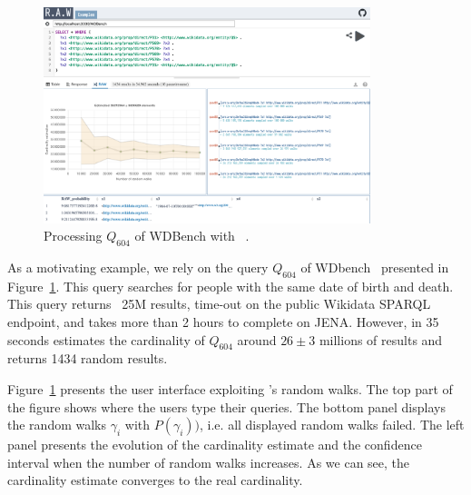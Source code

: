  \begin{figure}
   \centering
   \includegraphics[width=0.85\textwidth]{figures/raw_screenshot.png}
   \caption{\label{fig:raw_screenshot} Processing  $Q_{604}$ of
     WDBench\cite{angles2022wdbench} with ~\NAME.}
 \end{figure}


 As a motivating example, we rely on the query $Q_{604}$ of
 WDbench~\cite{angles2022wdbench} presented in
 Figure~\ref{fig:raw_screenshot}. This query searches for people
 with the same date of birth and death. This query returns ~25M results,
 time-out on the public Wikidata SPARQL endpoint, and takes more than
 2 hours to complete on JENA. However, in 35 seconds \NAME estimates
 the cardinality of $Q_{604}$ around $26 \pm 3$ millions of results and
 returns 1434 random results.

 
 Figure~\ref{fig:raw_screenshot} presents the user interface
 exploiting \NAME's random walks. The top part of the figure shows
 where the users type their queries. The bottom panel displays the
 random walks $\gamma_i$ with $P(\gamma_i))$, i.e. all displayed random
 walks failed.  The left panel presents the evolution of the cardinality
 estimate and the confidence interval when the number of random walks
 increases. As we can see, the cardinality estimate converges to the
 real cardinality.

